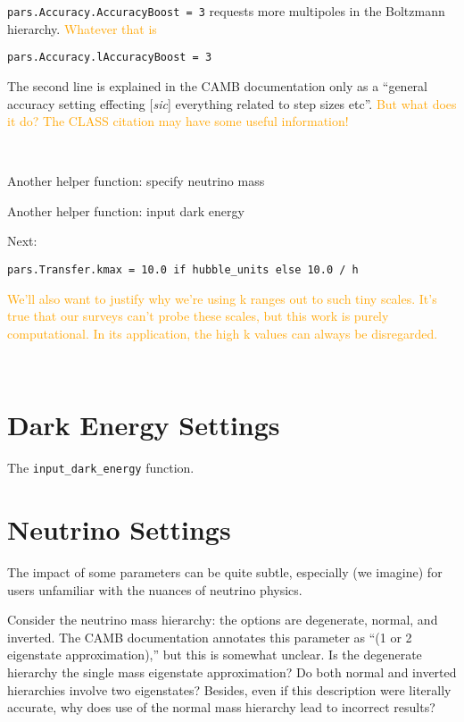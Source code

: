 \verb|pars.Accuracy.AccuracyBoost = 3| \quad requests more multipoles in the Boltzmann hierarchy. \textcolor{orange}{Whatever that is}

\verb|pars.Accuracy.lAccuracyBoost = 3|

The second line is explained in the CAMB documentation only as a ``general 
accuracy setting effecting [\textit{sic}] everything related to step sizes 
etc''. \textcolor{orange}{But what does it do? The CLASS citation may have 
some useful information!}

\

Another helper function: specify neutrino mass

Another helper function: input dark energy

Next: 

\verb|pars.Transfer.kmax = 10.0 if hubble_units else 10.0 / h|


\textcolor{orange}{We'll also want to justify why we're using k ranges out to
such tiny scales. It's true that our surveys can't probe these scales, but
this work is purely computational. In its application, the high k values can
always be disregarded.}

\

\section{Dark Energy Settings}

The \verb|input_dark_energy| function.

\section{Neutrino Settings}


The impact of some parameters can be quite subtle, especially (we imagine)
for users unfamiliar with the nuances of neutrino physics.

Consider the neutrino mass 
hierarchy: the options are degenerate, normal, and inverted. The CAMB 
documentation annotates this parameter as ``(1 or 2 eigenstate 
approximation),'' but this is somewhat unclear. Is the degenerate hierarchy 
the single mass eigenstate approximation? Do both normal and inverted 
hierarchies involve two eigenstates? Besides, even if this description were
literally accurate, why does use of the normal mass hierarchy lead to
incorrect results?

